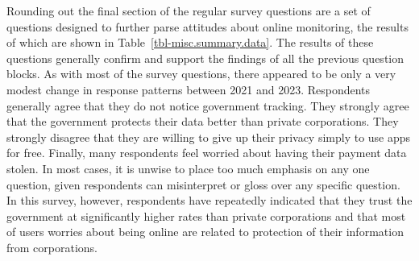 \documentclass[
  letterpaper,
  DIV=11,
  numbers=noendperiod]{scrartcl}
\begin{document}
\hypertarget{tbl-track.summary.data}{}
\begin{table}
\caption{\label{tbl-track.summary.data}Attitudes regarding tracking summary data }\tabularnewline

\centering
{}
\end{table}

Rounding out the final section of the regular survey questions are a set
of questions designed to further parse attitudes about online
monitoring, the results of which are shown in
Table~\ref{tbl-misc.summary.data}. The results of these questions
generally confirm and support the findings of all the previous question
blocks. As with most of the survey questions, there appeared to be only
a very modest change in response patterns between 2021 and 2023.
Respondents generally agree that they do not notice government tracking.
They strongly agree that the government protects their data better than
private corporations. They strongly disagree that they are willing to
give up their privacy simply to use apps for free. Finally, many
respondents feel worried about having their payment data stolen. In most
cases, it is unwise to place too much emphasis on any one question,
given respondents can misinterpret or gloss over any specific question.
In this survey, however, respondents have repeatedly indicated that they
trust the government at significantly higher rates than private
corporations and that most of users worries about being online are
related to protection of their information from corporations.
\end{document}
